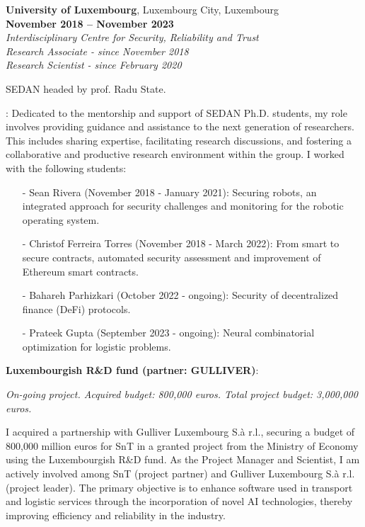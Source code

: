 \documentclass[margin,line]{resume}
\begin{document}
\begin{resume}
\textbf{University of Luxembourg}, Luxembourg City, Luxembourg\\  \phantom{.} \hfill \textbf{November 2018 -- November 2023}\\
\textit{Interdisciplinary Centre for Security, Reliability and Trust}\hfill\\
\textit{Research Associate - since November 2018}\hfill\\
\textit{Research Scientist - since February 2020}\hfill  
\vspace{-3mm}\\\vspace{-1mm}
\begin{list2}
	\item {} SEDAN headed by prof. Radu State.
	\item {}: Dedicated to the mentorship and support of SEDAN Ph.D. students, my role involves providing guidance and assistance to the next generation of researchers. This includes sharing expertise, facilitating research discussions, and fostering a collaborative and productive research environment within the group. I worked with the following students:
	\begin{itemize}
		\item[-] Sean Rivera (November 2018 - January 2021): Securing robots, an integrated approach for security challenges and monitoring for the robotic operating system.
		\item[-] Christof Ferreira Torres (November 2018 - March 2022): From smart to secure contracts, automated security assessment and improvement of Ethereum smart contracts.
		\item[-] Bahareh Parhizkari (October 2022 - ongoing): Security of decentralized finance (DeFi) protocols.
		\item[-] Prateek Gupta (September 2023 - ongoing): Neural combinatorial optimization for logistic problems.
	\end{itemize}
	
	\item \filbreak\textbf{Luxembourgish R\&D fund (partner: GULLIVER)}: 
	
	\emph{On-going project. Acquired budget: 800,000 euros. Total project budget: 3,000,000 euros.}
	
	I acquired a partnership with Gulliver Luxembourg S.à r.l., securing a budget of 800,000 million euros for SnT in a granted project from the Ministry of Economy using the Luxembourgish R\&D fund. As the Project Manager and Scientist, I am actively involved among SnT (project partner) and Gulliver Luxembourg S.à r.l. (project leader). The primary objective is to enhance software used in transport and logistic services through the incorporation of novel AI technologies, thereby improving efficiency and reliability in the industry.


\end{list2}
\end{resume}
\end{document}
